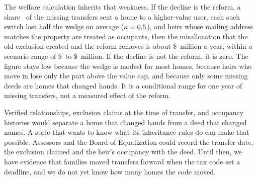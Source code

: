 The welfare calculation inherits that weakness. If the decline is the reform, a share \WViAlpha\ of the missing transfers sent a home to a higher-value user, each such switch lost half the wedge on average ($\kappa=0.5$), and heirs whose mailing address matches the property are treated as occupants, then the misallocation that the old exclusion created and the reform removes is about \$\WViLossCentral\ million a year, within a scenario range of \$\WViLossLow\ to \$\WViLossHigh\ million. If the decline is not the reform, it is zero. The figure stays low because the wedge is modest for most homes, because heirs who move in lose only the part above the value cap, and because only some missing deeds are homes that changed hands. It is a conditional range for one year of missing transfers, not a measured effect of the reform.

Verified relationships, exclusion claims at the time of transfer, and occupancy histories would separate a home that changed hands from a deed that changed names. A state that wants to know what its inheritance rules do can make that possible. Assessors and the Board of Equalization could record the transfer date, the exclusion claimed and the heir's occupancy with the deed. Until then, we have evidence that families moved transfers forward when the tax code set a deadline, and we do not yet know how many homes the code moved.

